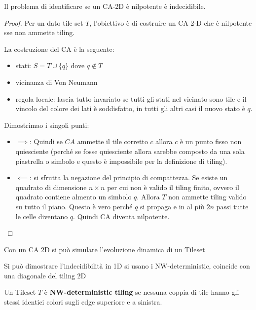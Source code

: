 \begin{teorema} 
    Il problema di identificare se un CA-2D è nilpotente è indecidibile. 
    \begin{proof}
        Per un dato tile set $T$, l'obiettivo è di costruire un CA 2-D che è
        nilpotente sse non ammette tiling.

        La costruzione del CA è la seguente:
        \begin{itemize}
            \item stati: $S=T\cup \{q\}$ dove $q\not\in T$
            \item vicinanza di Von Neumann
            \item regola locale: lascia tutto invariato se tutti gli stati nel 
            vicinato sono tile e il vincolo del colore dei lati è soddisfatto, in 
            tutti gli altri casi il nuovo stato è $q$.
        \end{itemize}
        Dimostrimao i singoli punti:
        \begin{itemize}
            \item $\implies$:
            Quindi se $CA$ ammette il tile corretto $c$ allora $c$ è un punto fisso 
            non quiesciente (perché se fosse quiesciente allora sarebbe composto 
            da una sola piastrella o simbolo e questo è impossibile per la definizione 
            di tiling). 
            \item $\impliedby$: si sfrutta la negazione del principio di compattezza.
            Se esiste un quadrato di dimensione $n\times n$ per cui non è valido 
            il tiling finito, ovvero il quadrato contiene almento un simbolo $q$.
            Allora $T$ non ammette tiling valido su tutto il piano. Questo è vero
            perché $q$ si propaga e in al più $2n$ passi tutte le celle diventano 
            $q$. Quindi CA diventa nilpotente.
        \end{itemize}
    \end{proof}
\end{teorema}

\begin{nota}
    Con un CA 2D si può simulare l'evoluzione dinamica di un Tileset
\end{nota}

Si può dimostrare l'indecidibilità in 1D si usano i NW-deterministic, coincide 
con una diagonale del tiling 2D  

\begin{definizione} 
    Un Tileset $T$ è \textbf{NW-deterministic tiling} se nessuna coppia di tile
    hanno gli stessi identici colori sugli edge superiore e a sinistra.
\end{definizione}

